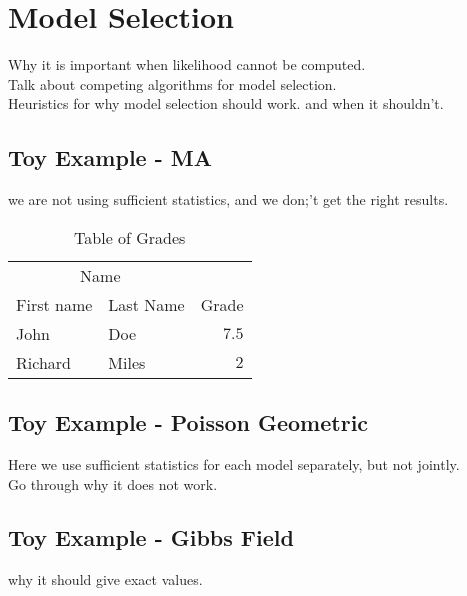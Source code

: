 \documentclass[fleqn,10pt]{SelfArx} %
\begin{document}

\section{Model Selection}

Why it is important when likelihood cannot be computed.\\
Talk about competing algorithms for model selection. \\
Heuristics for why model selection should work. and when it shouldn't.\\


\subsection{Toy Example - MA}
 we are not using sufficient statistics, and we don;'t get the right results.

\begin{table}[hbt]
\caption{Table of Grades}
\centering
\begin{tabular}{llr}
\toprule
\multicolumn{2}{c}{Name} \\
\cmidrule(r){1-2}
First name & Last Name & Grade \\
\midrule
John & Doe & $7.5$ \\
Richard & Miles & $2$ \\
\bottomrule
\end{tabular}
\label{tab:label}
\end{table}

\subsection{Toy Example - Poisson Geometric}
Here we use sufficient statistics for each model separately, but not jointly.\\
Go through why it does not work.\\

\subsection{Toy Example - Gibbs Field}
why it should give exact values. \\


\end{document}
